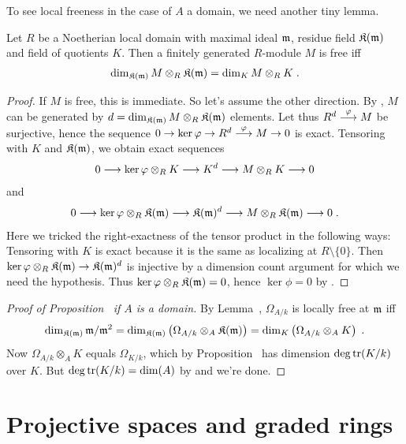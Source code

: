 \documentclass[a4paper,parskip=half,numbers=enddot, DIV=12]{scrreprt}
\begin{document}
To see local freeness in the case of $A$ a domain, we need another tiny lemma.
\begin{lem}
	Let $R$ be a Noetherian local domain with maximal ideal $\mathfrak{m}$, residue field $\mathfrak{K}(\mathfrak{m})$ and field of quotients $K$. Then a finitely generated $R$-module $M$ is free iff 
	\begin{align*}
		\dim_{\mathfrak{K}(\mathfrak{m})}M\otimes_R\mathfrak{K}(\mathfrak{m})=\dim_KM\otimes_RK\;.
	\end{align*}
\end{lem}
\begin{proof}
	If $M$ is free, this is immediate. So let's assume the other direction. By \NAK, $M$ can be generated by $d=\dim_{\mathfrak{K}(\mathfrak{m})}M\otimes_R\mathfrak{K}(\mathfrak{m})$ elements. Let thus $R^d\morphism[\phi]M$ be surjective, hence the sequence $0\morphism\ker\phi\morphism R^d\morphism[\phi]M\morphism0$ is exact. Tensoring with $K$ and $\mathfrak{K}(\mathfrak{m})$, we obtain exact sequences
	\begin{align*}
		0\morphism \ker\phi\otimes_RK\morphism K^d\morphism M\otimes_RK\morphism 0
	\end{align*}
	and
	\begin{align*}
		0\morphism\ker\phi\otimes_R\KK(\mm)\morphism\KK(\mm)^d\morphism M\otimes_R\KK(\mm)\morphism 0\;.
	\end{align*}
	Here we tricked the right-exactness of the tensor product in the following ways: Tensoring with $K$ is exact because it is the same as localizing at $R\setminus \{0\}$. Then $\ker\phi\otimes_R\KK(\mm)\morphism\KK(\mm)^d$ is injective by a dimension count argument for which we need the hypothesis. Thus $\ker\varphi\otimes_R\mathfrak{K}(\mathfrak{m})=0$, hence $\ker\phi=0$ by \NAK.
\end{proof}
\begin{proof}[Proof of Proposition~ if $A$ is a domain]
	By Lemma~, $\Omega_{A/k}$ is locally free at $\mathfrak{m}$ iff 
	\begin{align*}
		\dim_{\mathfrak{K}(\mathfrak{m})}\mathfrak{m}/\mathfrak{m}^2=\dim_{\mathfrak{K}(\mathfrak{m})}\left(\Omega_{A/k}\otimes_A\mathfrak{K}(\mathfrak{m})\right)=\dim_K\left(\Omega_{A/k}\otimes_AK\right)\;.
	\end{align*}
	Now $\Omega_{A/k}\otimes_AK$ equals $\Omega_{K/k}$, which by Proposition~ has dimension $\deg\operatorname{tr}(K/k)$ over $K$. But $\deg\operatorname{tr}(K/k)=\dim(A)$ by \cite[Theorem~10]{alg1} and we're done.
\end{proof}

\chapter{Projective spaces and graded rings}
\end{document}
